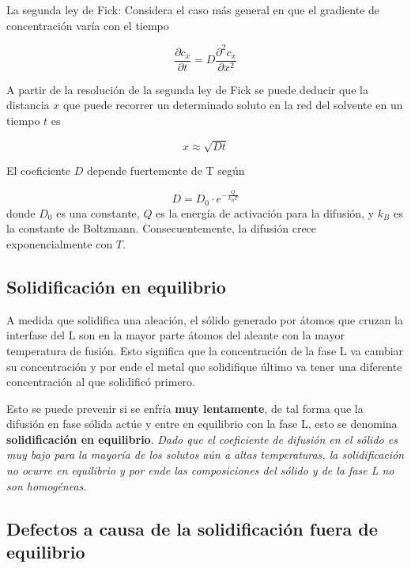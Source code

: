 La segunda ley de Fick: Considera el caso más general en que el gradiente de concentración varía con el tiempo

\begin{equation}
	\frac{\partial c_x}{\partial t} = D \frac{\partial^2 c_x}{\partial x ^2}
\end{equation}

A partir de la resolución de la segunda ley de Fick se puede deducir que la distancia $x$ que puede recorrer un determinado soluto en la red del solvente en un tiempo $t$ es

\begin{equation}
	x \approx \sqrt{Dt}
\end{equation}

El coeficiente $D$ depende fuertemente de T según

\begin{equation}
	D = D_0 \cdot e^{-\frac{Q}{k_B T}}
\end{equation}
donde $D_0$ es una constante, $Q$ es la energía de activación para la difusión, y $k_B$ es la constante de Boltzmann. Consecuentemente, la difusión crece exponencialmente con $T$.

\subsection{Solidificación en equilibrio}

A medida que solidifica una aleación, el sólido generado por átomos que cruzan la interfase del L son en la mayor parte átomos del aleante con la mayor temperatura de fusión. Esto significa que la concentración de la fase L va cambiar su concentración y por ende el metal que solidifique último va tener una diferente concentración al que solidificó primero.

Esto se puede prevenir si se enfría \textbf{muy lentamente}, de tal forma que la difusión en fase sólida actúe y entre en equilibrio con la fase L, esto se denomina \textbf{solidificación en equilibrio}. \textit{Dado que el coeficiente de difusión en el sólido  es muy bajo para la mayoría de los solutos aún a altas temperaturas, la solidificación no ocurre en equilibrio y por ende las composiciones del sólido y de la fase L no son homogéneas.}

\subsection{Defectos a causa de la solidificación fuera de equilibrio}

